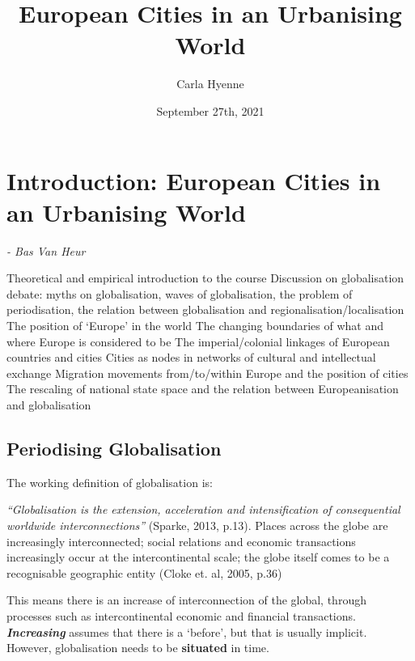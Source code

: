 \documentclass{article}
\title{European Cities in an Urbanising World}
\author{Carla Hyenne }
\begin{document}
\maketitle

\tableofcontents

\pagebreak


\section{Introduction: European Cities in an Urbanising World}
\date{September 27th, 2021} \textit{- Bas Van Heur}

\begin{outline}
	\1 Theoretical and empirical introduction to the course
	\1 Discussion on globalisation debate: myths on globalisation, waves of globalisation, the problem of periodisation, the relation between globalisation and regionalisation/localisation
	\1 The position of `Europe' in the world
		\2 The changing boundaries of what and where Europe is considered to be
		\2 The imperial/colonial linkages of European countries and cities
		\2 Cities as nodes in networks of cultural and intellectual exchange
		\2 Migration movements from/to/within Europe and the position of cities
		\2 The rescaling of national state space and the relation between Europeanisation and globalisation
\end{outline}

\subsection{Periodising Globalisation}

The working definition of globalisation is:

\begin{outline}
	\1 \textit{``Globalisation is the extension, acceleration and intensification of consequential worldwide interconnections''} (Sparke, 2013, p.13). 
	\1 Places across the globe are increasingly interconnected; social relations and economic transactions increasingly occur at the intercontinental scale; the globe itself comes to be a recognisable geographic entity (Cloke et. al, 2005, p.36)
\end{outline}

This means there is an increase of interconnection of the global, through processes such as intercontinental economic and financial transactions. \textit{\textbf{Increasing}} assumes that there is a `before', but that is usually implicit. However, globalisation needs to be \textbf{situated} in time. 
\end{document}
